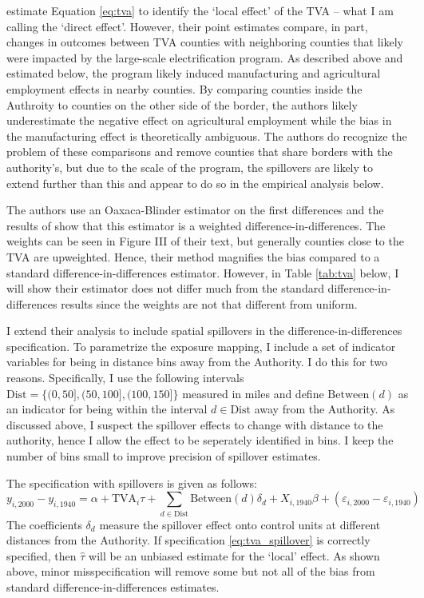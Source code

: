 \documentclass[11pt]{article}
\begin{document}
\citet{Kline_Moretti_2014} estimate Equation \ref{eq:tva} to identify the `local effect' of the TVA -- what I am calling the `direct effect'. However, their point estimates compare, in part, changes in outcomes between TVA counties with neighboring counties that likely were impacted by the large-scale electrification program. As described above and estimated below, the program likely induced manufacturing and agricultural employment effects in nearby counties. By comparing counties inside the Authroity to counties on the other side of the border, the authors likely underestimate the negative effect on agricultural employment while the bias in the manufacturing effect is theoretically ambiguous. The authors do recognize the problem of these comparisons and remove counties that share borders with the authority's, but due to the scale of the program, the spillovers are likely to extend further than this and appear to do so in the empirical analysis below.  

The authors use an Oaxaca-Blinder estimator on the first differences and the results of \citet{Kline_2011} show that this estimator is a weighted difference-in-differences. The weights can be seen in Figure III of their text, but generally counties close to the TVA are upweighted. Hence, their method magnifies the bias compared to a standard difference-in-differences estimator.  However, in Table \ref{tab:tva} below, I will show their estimator does not differ much from the standard difference-in-differences results since the weights are not that different from uniform. 

I extend their analysis to include spatial spillovers in the difference-in-differences specification. To parametrize the exposure mapping, I include a set of indicator variables for being in distance bins away from the Authority. I do this for two reasons. Specifically, I use the following intervals $\text{Dist} = \{(0, 50], (50, 100], (100, 150]\}$ measured in miles and define $\text{Between}(d)$ as an indicator for being within the interval $d \in \text{Dist}$ away from the Authority. As discussed above, I suspect the spillover effects to change with distance to the authority, hence I allow the effect to be seperately identified in bins. I keep the number of bins small to improve precision of spillover estimates.

The specification with spillovers is given as follows:  
\begin{equation}\label{eq:tva_spillover}
    y_{i, 2000} - y_{i, 1940} = \alpha + \text{TVA}_i \tau + \sum_{d \in \text{Dist}} \text{Between}(d)\delta_d + X_{i, 1940} \beta + (\varepsilon_{i, 2000} - \varepsilon_{i, 1940})
\end{equation} 
The coefficients $\delta_d$ measure the spillover effect onto control units at different distances from the Authority. If specification \ref{eq:tva_spillover} is correctly specified, then $\hat{\tau}$ will be an unbiased estimate for the `local' effect. As shown above, minor misspecification will remove some but not all of the bias from standard difference-in-differences estimates. 
\end{document}

